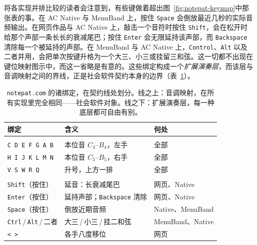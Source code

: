 \documentclass[10pt,letterpaper,twocolumn]{article}
\begin{document}
将各实现并排比较的读者会注意到，有些键做着超出图~\ref{fig:notepat-keymap}中那张表的事。在 AC Native 与 MenuBand 上，按住 \texttt{Space} 会倒放最近几秒的实际音频输出。在网页作品与 AC Native 上，敲击一个音符时按住 \texttt{Shift}，会在松开时给那个声部一条长长的衰减尾巴；按住 \texttt{Enter} 会无限延持该声部，而 \texttt{Backspace} 清除每一个被延持的声部。在 MenuBand 与 AC Native 上，\texttt{Control}、\texttt{Alt} 以及二者并用，会把单次按键升格为一个大三、小三或挂留三和弦。这一切都不出现在键位映射图示中，而这一省略是有意的。这些绑定构成一个\emph{扩展演奏层}，而该层与音调映射之间的界线，正是社会软件契约本身的边界（表~\ref{tab:contract-line}）。

\begin{table}[t]
\footnotesize
\setlength{\tabcolsep}{3pt}
\renewcommand{\arraystretch}{1.05}
\centering
\caption{\texttt{notepat.com} 的诸绑定，在契约线处划分。线之上：音调映射，在所有实现里完全相同——社会软件对象。线之下：扩展演奏层，每一种底层都可自由有别。}
\label{tab:contract-line}
\begin{tabularx}{\columnwidth}{@{}>{\RaggedRight}p{}>{\RaggedRight}X>{\RaggedRight\arraybackslash}p{}@{}}
\toprule
\textbf{绑定} & \textbf{含义} & \textbf{何处} \\
\midrule
\multicolumn{3}{@{}l}{\emph{音调契约}} \\[0.1em]
\texttt{C D E F G A B} & 本位音 $C_4$--$B_4$，左手 & 全部 \\
\texttt{H I J K L M N} & 本位音 $C_5$--$B_5$，右手 & 全部 \\
\texttt{V S W R Q} & 升号，上方一排 & 全部 \\
\midrule
\multicolumn{3}{@{}l}{\emph{扩展演奏层}} \\[0.1em]
\texttt{Shift}（按住） & 延音：长衰减尾巴 & 网页、Native \\
\texttt{Enter}（按住） & 延持声部；\texttt{Backspace} 清除 & 网页、Native \\
\texttt{Space}（按住） & 倒放近期音频 & Native、MenuBand \\
\texttt{Ctrl}\,/\,\texttt{Alt}\,/\,二者 & 大三\,/\,小三\,/\,挂二和弦 & MenuBand、Native \\
\texttt{<}~\texttt{>} & 各手八度移位 & 网页 \\
\bottomrule
\end{tabularx}
\end{table}
\end{document}
